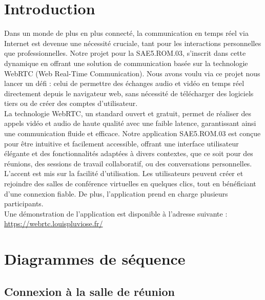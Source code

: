 \documentclass[12pt, a4paper, oneside]{thesis}
\begin{document}
\lstlistoflistings

\listoffigures

\newpage

\section{Introduction}

Dans un monde de plus en plus connecté, la communication en temps réel via Internet est devenue une nécessité cruciale, tant pour les interactions personnelles que professionnelles. Notre projet pour la SAE5.ROM.03, s'inscrit dans cette dynamique en offrant une solution de communication basée sur la technologie WebRTC (Web Real-Time Communication). Nous avons voulu via ce projet nous lancer un défi : celui de permettre des échanges audio et vidéo en temps réel directement depuis le navigateur web, sans nécessité de télécharger des logiciels tiers ou de créer des comptes d'utilisateur.\\

La technologie WebRTC, un standard ouvert et gratuit, permet de réaliser des appels vidéo et audio de haute qualité avec une faible latence, garantissant ainsi une communication fluide et efficace. Notre application SAE5.ROM.03 est conçue pour être intuitive et facilement accessible, offrant une interface utilisateur élégante et des fonctionnalités adaptées à divers contextes, que ce soit pour des réunions, des sessions de travail collaboratif, ou des conversations personnelles.\\

L'accent est mis sur la facilité d'utilisation. Les utilisateurs peuvent créer et rejoindre des salles de conférence virtuelles en quelques clics, tout en bénéficiant d'une connexion fiable. De plus, l'application prend en charge plusieurs participants.\\

Une démonstration de l'application est disponible à l'adresse suivante : \url{https://webrtc.louispluviose.fr/}
\newpage

\section{Diagrammes de séquence}

\subsection{Connexion à la salle de réunion}
\end{document}
